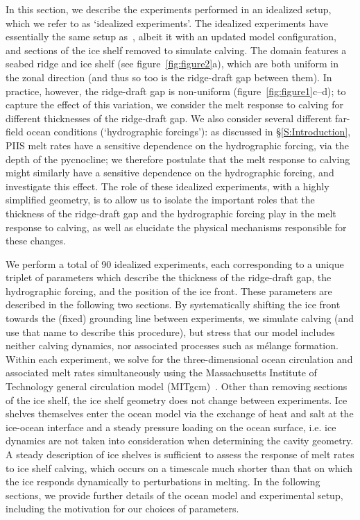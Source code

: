\documentclass[draft]{agujournal2019}
\begin{document}
In this section, we describe the experiments performed in an idealized setup, which we refer to as `idealized experiments'. The idealized experiments have essentially the same setup as~, albeit it with an updated model configuration, and sections of the ice shelf removed to simulate calving. The domain features a seabed ridge and ice shelf (see figure~\ref{fig:figure2}a), which are both uniform in the zonal direction (and thus so too is the ridge-draft gap between them). In practice, however, the ridge-draft gap is non-uniform (figure~\ref{fig:figure1}c--d); to capture the effect of this variation, we consider the melt response to calving for different thicknesses of the ridge-draft gap. We also consider several different far-field ocean conditions (`hydrographic forcings'): as discussed in \S\ref{S:Introduction}, PIIS melt rates have a sensitive dependence on the hydrographic forcing, via the depth of the pycnocline; we therefore postulate that the melt response to calving might similarly have a sensitive dependence on the hydrographic forcing, and investigate this effect. The role of these idealized experiments, with a highly simplified geometry, is to allow us to isolate the important roles that the thickness of the ridge-draft gap and the hydrographic forcing play in the melt response to calving, as well as elucidate the physical mechanisms responsible for these changes.

We perform a total of 90 idealized experiments, each corresponding to a unique triplet of parameters which describe the thickness of the ridge-draft gap, the hydrographic forcing, and the position of the ice front. These parameters are described in the following two sections. By systematically shifting the ice front towards the (fixed) grounding line between experiments, we simulate calving (and use that name to describe this procedure), but stress that our model includes neither calving dynamics, nor associated processes such as mélange formation. Within each experiment, we solve for the three-dimensional ocean circulation and associated melt rates simultaneously using the Massachusetts Institute of Technology general circulation model (MITgcm)~\cite{Marshall1997JGROceans}. Other than removing sections of the ice shelf, the ice shelf geometry does not change between experiments. Ice shelves themselves enter the ocean model via the exchange of heat and salt at the ice-ocean interface and a steady pressure loading on the ocean surface, i.e. ice dynamics are not taken into consideration when determining the cavity geometry. A steady description of ice shelves is sufficient to assess the response of melt rates to ice shelf calving, which occurs on a timescale much shorter than that on which the ice responds dynamically to perturbations in melting. In the following sections, we provide further details of the ocean model and experimental setup, including the motivation for our choices of parameters.
\end{document}
